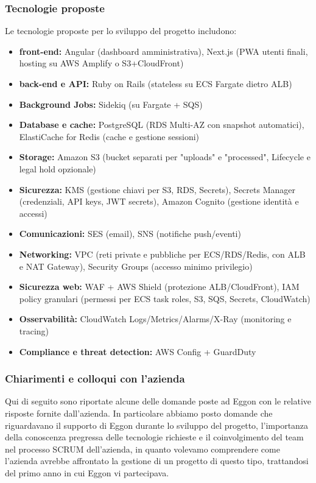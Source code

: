 \documentclass[a4paper,11pt]{article}
\begin{document}
\subsubsection{Tecnologie proposte}
Le tecnologie proposte per lo sviluppo del progetto includono:
\begin{itemize}[noitemsep, topsep=0pt]
 \item \textbf{front-end:} Angular (dashboard amministrativa), Next.js (PWA utenti finali, hosting su AWS Amplify o S3+CloudFront)
 \item \textbf{back-end e API:} Ruby on Rails (stateless su ECS Fargate dietro ALB)
 \item \textbf{Background Jobs:} Sidekiq (su Fargate + SQS)
 \item \textbf{Database e cache:} PostgreSQL (RDS Multi-AZ con snapshot automatici), ElastiCache for Redis (cache e gestione sessioni)
 \item \textbf{Storage:} Amazon S3 (bucket separati per "uploads" e "processed", Lifecycle e legal hold opzionale)
 \item \textbf{Sicurezza:} KMS (gestione chiavi per S3, RDS, Secrets), Secrets Manager (credenziali, API keys, JWT secrets), Amazon Cognito (gestione identità e accessi)
 \item \textbf{Comunicazioni:} SES (email), SNS (notifiche push/eventi)
 \item \textbf{Networking:} VPC (reti private e pubbliche per ECS/RDS/Redis, con ALB e NAT Gateway), Security Groups (accesso minimo privilegio)
 \item \textbf{Sicurezza web:} WAF + AWS Shield (protezione ALB/CloudFront), IAM policy granulari (permessi per ECS task roles, S3, SQS, Secrets, CloudWatch)
 \item \textbf{Osservabilità:} CloudWatch Logs/Metrics/Alarms/X-Ray (monitoring e tracing)
 \item \textbf{Compliance e threat detection:} AWS Config + GuardDuty
\end{itemize}

\subsubsection{Chiarimenti e colloqui con l'azienda}

\parbox[t]{\linewidth}{%
Qui di seguito sono riportate alcune delle domande poste ad Eggon con le relative risposte fornite dall'azienda. In particolare abbiamo posto domande che riguardavano il supporto di Eggon durante lo sviluppo del progetto, l'importanza della conoscenza pregressa delle tecnologie richieste e il coinvolgimento del team nel processo SCRUM dell'azienda, in quanto volevamo comprendere come l'azienda avrebbe affrontato la gestione di un progetto di questo tipo, trattandosi del primo anno in cui Eggon vi partecipava.
}
\end{document}
